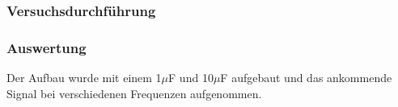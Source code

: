\documentclass[12pt,a4paper]{article}
\begin{document}
\subsubsection{Versuchsdurchführung}


\subsubsection{Auswertung}

Der Aufbau wurde mit einem 1$\mu$F und 10$\mu$F aufgebaut und das ankommende Signal bei verschiedenen Frequenzen aufgenommen.
\end{document}
